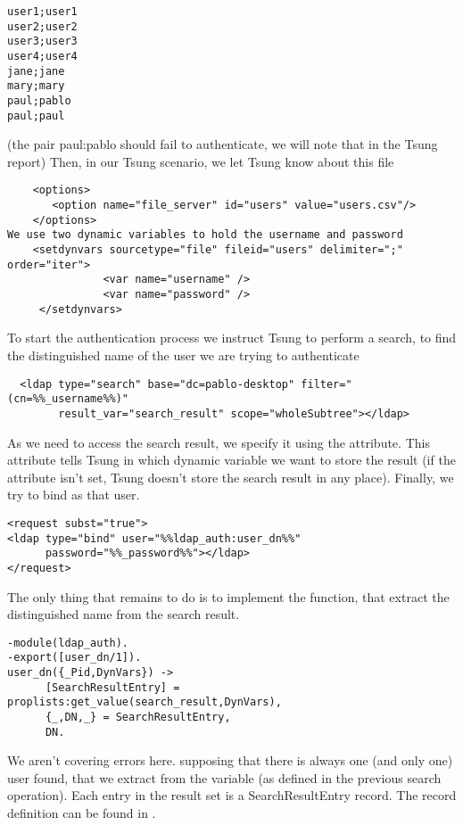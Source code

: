 \documentclass{TSUNG-en}
\begin{document}
\begin{Verbatim}
user1;user1
user2;user2
user3;user3
user4;user4
jane;jane
mary;mary
paul;pablo
paul;paul
\end{Verbatim}

(the pair paul:pablo should fail to authenticate, we will note that in the Tsung report)
Then, in our Tsung scenario, we let Tsung know about this file

\begin{Verbatim}
    <options>
       <option name="file_server" id="users" value="users.csv"/>
    </options>
We use two dynamic variables to hold the username and password
    <setdynvars sourcetype="file" fileid="users" delimiter=";" order="iter">
               <var name="username" />
               <var name="password" />
     </setdynvars>
\end{Verbatim}

To start the authentication process we instruct Tsung to perform a search, to find the distinguished name of the user we are trying to authenticate

\begin{Verbatim}
  <ldap type="search" base="dc=pablo-desktop" filter="(cn=%%_username%%)"
        result_var="search_result" scope="wholeSubtree"></ldap>
\end{Verbatim}

As we need to access the search result, we specify it using the  attribute. This attribute tells Tsung in which dynamic variable we want to store the result (if the  attribute isn't set, Tsung doesn't store the search result in any place).
Finally,  we try to bind as that user.
\begin{Verbatim}
<request subst="true">
<ldap type="bind" user="%%ldap_auth:user_dn%%"
      password="%%_password%%"></ldap>
</request>
\end{Verbatim}
The only thing that remains to do is to implement the  function, that extract the distinguished name from the search result.

\begin{Verbatim}
-module(ldap_auth).
-export([user_dn/1]).
user_dn({_Pid,DynVars}) ->
      [SearchResultEntry] = proplists:get_value(search_result,DynVars),
      {_,DN,_} = SearchResultEntry,
      DN.
\end{Verbatim}

We aren't covering errors here. supposing that there is always one (and only one) user found, that we extract from the  variable (as defined in the previous search operation).
Each entry in the result set is a SearchResultEntry record. The record definition can be found in .
\end{document}
